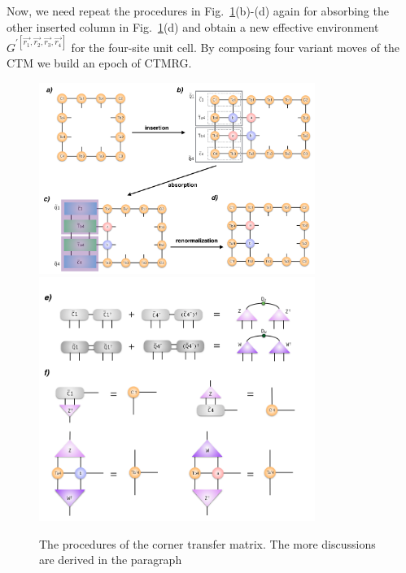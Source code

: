 Now, we need repeat the procedures in Fig.~\ref{fig512}(b)-(d) again for absorbing the other inserted column in Fig.~\ref{fig512}(d) and obtain a new effective environment $G^{\prime \left[\vec{r_1},\vec{r_2},\vec{r_3},\vec{r_4}\right]}$ for the four-site unit cell. By composing four variant moves of the CTM we build an epoch of CTMRG. 

\begin{figure}[ht]
	\centering
	\includegraphics[width=0.80\textwidth]{figures/fig512.png}
	\includegraphics[width=0.80\textwidth]{figures/fig513.png}
	\caption[The procedures of the corner transfer matrix.]{The procedures of the corner transfer matrix. The more discussions are derived in the paragraph}
	\label{fig512}
\end{figure}

